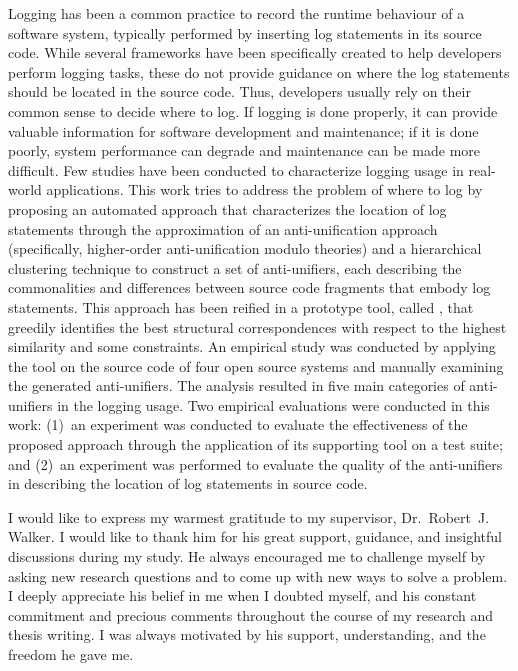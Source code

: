 \documentclass{ucalgthes1}
\theoremstyle{plain}
\theoremstyle{definition}
\newcommand{\tool}{\relax}
\begin{document}
\newpage
{}
{}
Logging has been a common practice to record the runtime behaviour of a software system, typically performed by inserting log statements in its source code. While several frameworks have been specifically created to help developers perform logging tasks, these do not provide guidance on where the log statements should be located in the source code. Thus, developers usually rely on their common sense to decide where to log. If logging is done properly, it can provide valuable information for software development and maintenance; if it is done poorly, system performance can degrade and maintenance can be made more difficult. Few studies have been conducted to characterize logging usage in real-world applications. This work tries to address the problem of where to log by proposing an automated approach that characterizes the location of log statements through the approximation of an anti-unification approach (specifically, higher-order anti-unification modulo theories) and a hierarchical clustering technique to construct a set of anti-unifiers, each describing the commonalities and differences between source code fragments that embody log statements. This approach has been reified in a prototype tool, called \tool{ELUS}, that greedily identifies the best structural correspondences with respect to the highest similarity and some constraints. An empirical study was conducted by applying the tool on the source code of four open source systems and manually examining the generated anti-unifiers. The analysis resulted in five main categories of anti-unifiers in the logging usage. Two empirical evaluations were conducted in this work: (1)~an experiment was conducted to evaluate the effectiveness of the proposed approach through the application of its supporting tool on a test suite; and (2)~an experiment was performed to evaluate the quality of the anti-unifiers in describing the location of log statements in source code.
\newpage
{}
{}

I would like to express my warmest gratitude to my supervisor, Dr.~Robert~J. Walker.  I would like to thank him for his great support, guidance, and insightful discussions during my study. He always encouraged me to challenge myself by asking new research questions and to come up with new ways to solve a problem. I deeply appreciate his belief in me when I doubted myself, and his constant commitment and precious comments throughout the course of my research and thesis writing. I was always motivated by his support, understanding, and the freedom he gave me.
\end{document}
